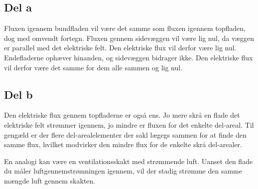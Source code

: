 \subsection{Del a} %
\label{sub:del_a}
Fluxen igennem bundfladen vil være det samme som fluxen igennem topfladen, dog med omvendt fortegn. Fluxen gennem sidevæggen vil være lig nul, da væggen er parallel med det elektriske felt. Den elektriske flux vil derfor være lig nul. Endefladerne ophæver hinanden, og sidevæggen  bidrager ikke. Den elektriske flux vil derfor være det samme for dem alle sammen og lig nul.

\subsection{Del b} %
\label{sub:del_b}
Den elektriske flux gennem topfladerne er også ens. Jo mere skrå en flade det elektriske felt strømmer igennem, jo mindre er fluxen for det enkelte del-areal. Til gengæld er der flere del-arealelementer der sakl lægegs sammen for at finde den samme flux, hvilket modvirker den mindre flux for de enkelte skrå del-arealer.

En analogi kan være en ventilationsskakt med strømmende luft. Uanset den flade du måler luftgennemstrømningen igennem, vil der stadig strømme den samme mængde luft gennem skakten.
